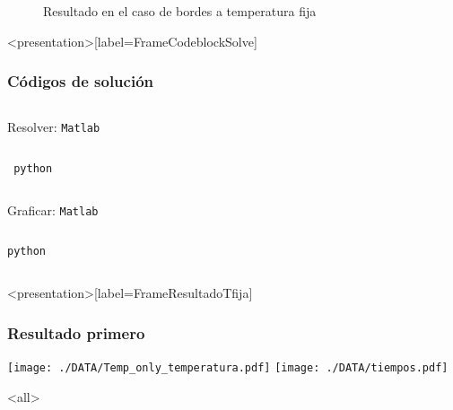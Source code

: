 \begin{figure}
  \caption{Resultado en el caso de bordes a temperatura fija
  \label{FiguraResultadoTfija}}
\end{figure}
%
\mode*
\begin{frame}<presentation>[label=FrameCodeblockSolve]
  \frametitle{Códigos de solución}
  
  \begin{columns}[T]
Resolver: \hfill    \texttt{Matlab}
  \begin{codeblock}
    
  \end{codeblock}
  \end{columns}

  \begin{columns}[T]
\hfill    \texttt{ python }
    \begin{codeblock}
      
    \end{codeblock}
  \end{columns}

  \begin{columns}[T]
  Graficar: \hfill \texttt{Matlab}
    \begin{codeblock}
      
    \end{codeblock}
  \end{columns}

  \begin{columns}[T]
    \hfill \texttt{python}
    \begin{codeblock}
      
    \end{codeblock}
  \end{columns}


\end{frame}
%
%
\begin{frame}<presentation>[label=FrameResultadoTfija]
  \frametitle{Resultado primero}
  \centering
    \texttt{[image: ./DATA/Temp\_only\_temperatura.pdf]}
    \hspace{1cm}
    \texttt{[image: ./DATA/tiempos.pdf]}

\end{frame}
\mode<all>
